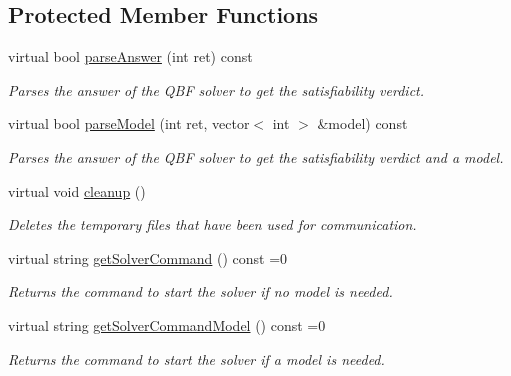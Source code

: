 \subsection*{Protected Member Functions}
\begin{DoxyCompactItemize}
\item 
virtual bool \hyperlink{classExtQBFSolver_a11ddbf3980824453238071e8a036f804}{parse\-Answer} (int ret) const 
\begin{DoxyCompactList}\small\item\em Parses the answer of the Q\-B\-F solver to get the satisfiability verdict. \end{DoxyCompactList}\item 
virtual bool \hyperlink{classExtQBFSolver_a3b43f437ee9286b62be1de73932b6636}{parse\-Model} (int ret, vector$<$ int $>$ \&model) const 
\begin{DoxyCompactList}\small\item\em Parses the answer of the Q\-B\-F solver to get the satisfiability verdict and a model. \end{DoxyCompactList}\item 
virtual void \hyperlink{classExtQBFSolver_a3ee48837c5e937e4d3a5b3c2a6b761d3}{cleanup} ()
\begin{DoxyCompactList}\small\item\em Deletes the temporary files that have been used for communication. \end{DoxyCompactList}\item 
virtual string \hyperlink{classExtQBFSolver_aec4c2d830f72283e2fbabf4a3f62a640}{get\-Solver\-Command} () const =0
\begin{DoxyCompactList}\small\item\em Returns the command to start the solver if no model is needed. \end{DoxyCompactList}\item 
virtual string \hyperlink{classExtQBFSolver_ac2bc9e4817cfa1a54195d7d9f1c7d3bd}{get\-Solver\-Command\-Model} () const =0
\begin{DoxyCompactList}\small\item\em Returns the command to start the solver if a model is needed. \end{DoxyCompactList}\end{DoxyCompactItemize}
